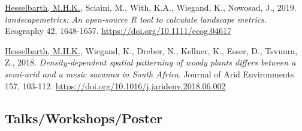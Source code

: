 \documentclass[hidelinks]{report}
\begin{document}
\begin{hangparas}{7.5mm}{1}
\underline{Hesselbarth, M.H.K.}, Sciaini, M., With, K.A., Wiegand, K., Nowosad, J., 2019. \textit{landscapemetrics: An open-source R tool to calculate landscape metrics}. Ecography 42, 1648-1657. \url{https://doi.org/10.1111/ecog.04617}

\underline{Hesselbarth, M.H.K.}, Wiegand, K., Dreber, N., Kellner, K., Esser, D., Tsvuura, Z., 2018. \textit{Density-dependent spatial patterning of woody plants differs between a semi-arid and a mesic savanna in South Africa}. Journal of Arid Environments 157, 103-112. \url{https://doi.org/10.1016/j.jaridenv.2018.06.002}

\end{hangparas}






\subsection*{Talks/Workshops/Poster}
\end{document}
